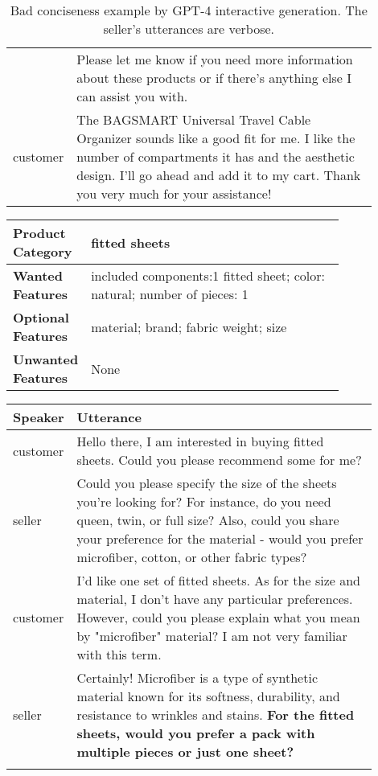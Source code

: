 \begin{table*}[t]
\begin{center}
\begin{tabular}{l p{0.9\linewidth} }
    &Please let me know if you need more information about these products or if there's anything else I can assist you with.\\ \hdashline
    customer& The BAGSMART Universal Travel Cable Organizer sounds like a good fit for me. I like the number of compartments it has and the aesthetic design. I'll go ahead and add it to my cart. Thank you very much for your assistance!\\
    \hline
    \end{tabular}
    \caption{Bad conciseness example by GPT-4 interactive generation. The seller's utterances are verbose.} \label{tab:bad_conciseness}
\end{center}
\end{table*}

\begin{table*}[t]
\small
\begin{center}
    \begin{tabular}{l p{0.82\linewidth} }
    \hline
    \textbf{Product Category} & fitted sheets \\ \hline
    \textbf{Wanted Features} & included components:1 fitted sheet; color: natural; number of pieces: 1 \\ \hline
    \textbf{Optional Features} & material; brand; fabric weight; size \\ \hline
    \textbf{Unwanted Features} & None \\ \hline 
    \end{tabular}
    \begin{tabular}{l p{0.9\linewidth} }
    \hline
    \textbf{Speaker} & \textbf{Utterance} \\
    \hline
customer& Hello there, I am interested in buying fitted sheets. Could you please recommend some for me?\\ \hdashline
seller& Could you please specify the size of the sheets you're looking for? For instance, do you need queen, twin, or full size? Also, could you share your preference for the material - would you prefer microfiber, cotton, or other fabric types?\\\hdashline
customer& I'd like one set of fitted sheets. As for the size and material, I don't have any particular preferences. However, could you please explain what you mean by "microfiber" material? I am not very familiar with this term.\\\hdashline
seller & Certainly! Microfiber is a type of synthetic material known for its softness, durability, and resistance to wrinkles and stains. \textbf{For the fitted sheets, would you prefer a pack with multiple pieces or just one sheet?}\\\hdashline

\end{tabular}
\end{center}
\end{table*}
